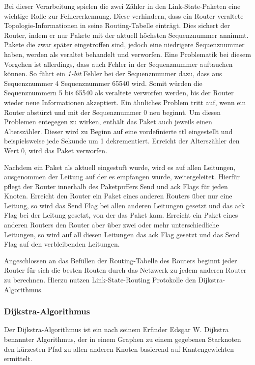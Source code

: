 \documentclass[1pt,a4paper,final]{article}
\begin{document}
Bei dieser Verarbeitung spielen die zwei Zähler in den Link-State-Paketen eine wichtige Rolle zur Fehlererkennung. 
Diese verhindern, dass ein Router veraltete Topologie-Informationen in seine Routing-Tabelle einträgt. Dies sichert der Router, indem er nur Pakete mit der aktuell höchsten Sequenznummer annimmt. 
Pakete die zwar später eingetroffen sind, jedoch eine niedrigere Sequenznummer haben, werden als veraltet behandelt und verworfen. 
Eine Problematik bei diesem Vorgehen ist allerdings, dass auch Fehler in der Sequenznummer auftauchen können. 
So führt ein \textit{1-bit} Fehler bei der Sequenznummer dazu, dass aus Sequenznummer 4 Sequenznummer 65540 wird.
Somit würden die Sequenznummern 5 bis 65540 als veraltete verworfen werden, bis der Router wieder neue Informationen akzeptiert.
Ein ähnliches Problem tritt auf, wenn ein Router abstürzt und mit der Sequenznummer 0 neu beginnt.
Um diesen Problemen entegegen zu wirken, enthält das Paket auch jeweils einen Alterszähler.
Dieser wird zu Beginn auf eine vordefinierte \ac{ttl} eingestellt und beispielsweise jede Sekunde um 1 dekrementiert. 
Erreicht der Alterszähler den Wert 0, wird das Paket verworfen.

Nachdem ein Paket als aktuell eingestuft wurde, wird es auf allen Leitungen, ausgenommen der Leitung auf der es empfangen wurde, weitergeleitet.
Hierfür pflegt der Router innerhalb des Paketpuffers Send und \ac{ack} Flags für jeden Knoten.
Erreicht den Router ein Paket eines anderen Routers über nur eine Leitung, so wird das Send Flag bei allen anderen Leitungen gesetzt und das \ac{ack} Flag bei der Leitung gesetzt, von der das Paket kam.
Erreicht ein Paket eines anderen Routers den Router aber über zwei oder mehr unterschiedliche Leitungen, so wird auf all diesen Leitungen das \ac{ack} Flag gesetzt und das Send Flag auf den verbleibenden Leitungen.

Angeschlossen an das Befüllen der Routing-Tabelle des Routers beginnt jeder Router für sich die besten Routen durch das Netzwerk zu jedem anderen Router zu berechnen.
Hierzu nutzen Link-State-Routing Protokolle den Dijkstra-Algorithmus.
\subsubsection{Dijkstra-Algorithmus}
Der Dijkstra-Algorithmus ist ein nach seinem Erfinder Edsgar W. Dijkstra benannter Algorithmus, der in einem Graphen zu einem gegebenen Starknoten den kürzesten Pfad zu allen anderen Knoten basierend auf Kantengewichten ermittelt.
\end{document}
